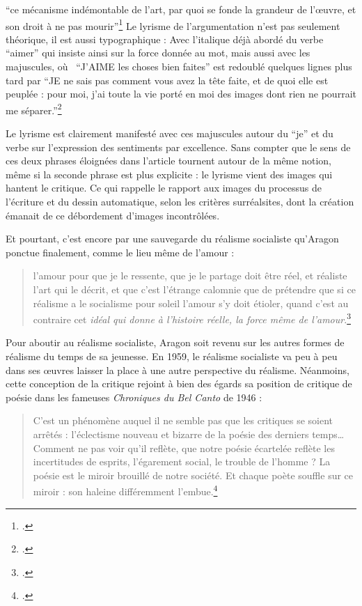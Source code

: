 \enquote{ce mécanisme indémontable de l’art, par quoi se fonde la grandeur de l’\oe{}uvre, et son droit à ne pas mourir}\footcite{savoiraimer} Le lyrisme de l’argumentation n’est pas seulement théorique, il est aussi typographique : Avec l’italique déjà abordé du verbe \enquote{aimer} qui insiste ainsi sur la force donnée au mot, mais aussi avec les majuscules, où  \enquote{J’AIME les choses bien faites} est redoublé quelques lignes plus tard par \enquote{JE ne sais pas comment vous avez la tête faite, et de quoi elle est peuplée : pour moi, j’ai toute la vie porté en moi des images dont rien ne pourrait me séparer.}\footcite{savoiraimer}

Le lyrisme est clairement manifesté avec ces majuscules autour du \enquote{je} et du verbe sur l’expression des sentiments par excellence. Sans compter que le sens de ces deux phrases éloignées dans l’article tournent autour de la même notion, même si la seconde phrase est plus explicite : le lyrisme vient des images qui hantent le critique. Ce qui rappelle le rapport aux images du processus de l'écriture et du dessin automatique, selon les critères surréalsites, dont la création émanait de ce débordement d'images incontrôlées. 

	Et pourtant, c’est encore par une sauvegarde du réalisme socialiste qu’Aragon ponctue finalement, comme le lieu même de l’amour : 
\begin{quote}
  l’amour pour que je le ressente, que je le partage doit  être réel, et réaliste l’art qui le décrit, et que c’est l’étrange calomnie que de prétendre que si ce réalisme a le socialisme pour soleil l’amour s’y doit étioler, quand c’est au contraire cet \emph{idéal qui donne à l’histoire réelle, la force même de l’amour}.\footcite{savoiraimer}\end{quote}


Pour aboutir au réalisme socialiste, Aragon soit revenu sur les autres formes de réalisme du temps de sa jeunesse. En 1959, le réalisme socialiste va peu à peu dans ses \oe{}uvres laisser la place à une autre perspective du réalisme. Néanmoins, cette conception de la critique rejoint à bien des égards sa position de critique de poésie dans les fameuses \emph{Chroniques du Bel Canto} de 1946 : 

\begin{quote}C’est un phénomène auquel il ne semble pas que les critiques se soient arrêtés : l’éclectisme nouveau et bizarre de la poésie des derniers temps…Comment ne pas voir qu’il reflète, que notre poésie écartelée reflète les incertitudes de esprits, l’égarement social, le trouble de l’homme ? La poésie est le miroir brouillé de notre société. Et chaque poète souffle sur ce miroir : son haleine différemment l’embue.\footcite[p93]{belcanto}\end{quote}

